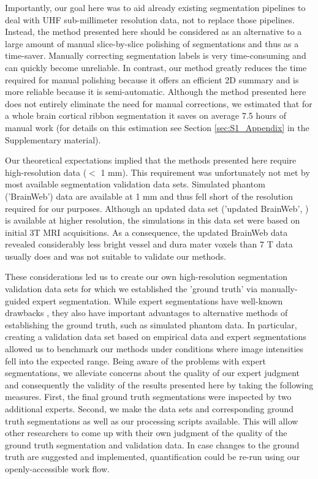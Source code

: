 Importantly, our goal here was to aid already existing segmentation pipelines to deal with UHF sub-millimeter resolution data, not to replace those pipelines. Instead, the method presented here should be considered as an alternative to a large amount of manual slice-by-slice polishing of segmentations and thus as a time-saver. Manually correcting segmentation labels is very time-consuming and can quickly become unreliable. In contrast, our method greatly reduces the time required for manual polishing because it offers an efficient 2D summary and is more reliable because it is semi-automatic. Although the method presented here does not entirely eliminate the need for manual corrections, we estimated that for a whole brain cortical ribbon segmentation it saves on average 7.5 hours of manual work (for details on this estimation see Section \ref{sec:S1_Appendix} in the Supplementary material).

Our theoretical expectations implied that the methods presented here require high-resolution data ($<$ 1 mm). This requirement was unfortunately not met by most available segmentation validation data sets. Simulated phantom ('BrainWeb') data \parencite{Collins1998} are available at 1 mm and thus fell short of the resolution required for our purposes. Although an updated data set ('updated BrainWeb', \cite{AubertBroche2006a,AubertBroche2006b}) is available at higher resolution, the simulations in this data set were based on initial 3T MRI acquisitions. As a consequence, the updated BrainWeb data revealed considerably less bright vessel and dura mater voxels than 7 T data usually does and was not suitable to validate our methods.

These considerations led us to create our own high-resolution segmentation validation data sets for which we established the 'ground truth' via manually-guided expert segmentation. While expert segmentations have well-known drawbacks \parencite{Despotovic2015, Valverde2015}, they also have important advantages to alternative methods of establishing the ground truth, such as simulated phantom data. In particular, creating a validation data set based on empirical data and expert segmentations allowed us to benchmark our methods under conditions where image intensities fell into the expected range. Being aware of the problems with expert segmentations, we alleviate concerns about the quality of our expert judgment and consequently the validity of the results presented here by taking the following measures. First, the final ground truth segmentations were inspected by two additional experts. Second, we make the data sets and corresponding ground truth segmentations as well as our processing scripts available. This will allow other researchers to come up with their own judgment of the quality of the ground truth segmentation and validation data. In case changes to the ground truth are suggested and implemented, quantification could be re-run using our openly-accessible work flow. 

